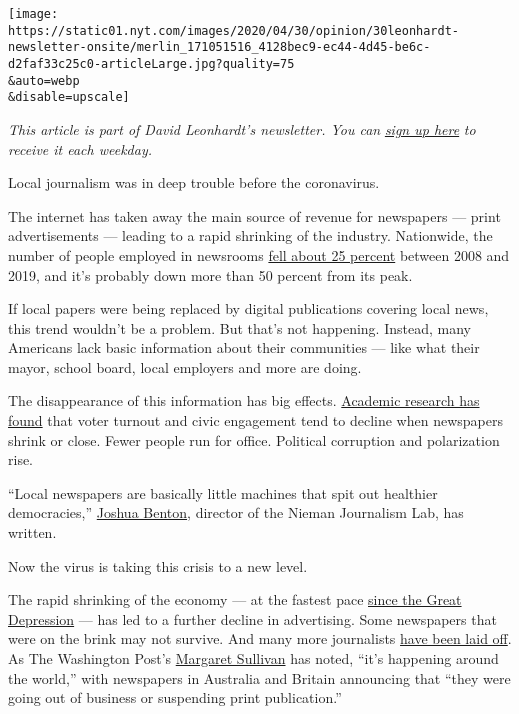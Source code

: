 \texttt{[image: https://static01.nyt.com/images/2020/04/30/opinion/30leonhardt-newsletter-onsite/merlin\_171051516\_4128bec9-ec44-4d45-be6c-d2faf33c25c0-articleLarge.jpg?quality=75\\\&auto=webp\\\&disable=upscale]}

\emph{This article is part of David Leonhardt's newsletter. You can}
\href{https://www.nytimes.com/newsletters/opiniontoday?action=click\&module=Intentional\&pgtype=Article}{\emph{sign
up here}} \emph{to receive it each weekday.}

Local journalism was in deep trouble before the coronavirus.

The internet has taken away the main source of revenue for newspapers
--- print advertisements --- leading to a rapid shrinking of the
industry. Nationwide, the number of people employed in newsrooms
\href{https://www.pewresearch.org/fact-tank/2020/04/20/u-s-newsroom-employment-has-dropped-by-a-quarter-since-2008/}{fell
about 25 percent} between 2008 and 2019, and it's probably down more
than 50 percent from its peak.

If local papers were being replaced by digital publications covering
local news, this trend wouldn't be a problem. But that's not happening.
Instead, many Americans lack basic information about their communities
--- like what their mayor, school board, local employers and more are
doing.

The disappearance of this information has big effects.
\href{https://medium.com/office-of-citizen/how-we-know-journalism-is-good-for-democracy-9125e5c995fb}{Academic
research has found} that voter turnout and civic engagement tend to
decline when newspapers shrink or close. Fewer people run for office.
Political corruption and polarization rise.

``Local newspapers are basically little machines that spit out healthier
democracies,''
\href{https://www.niemanlab.org/2019/04/when-local-newspapers-shrink-fewer-people-bother-to-run-for-mayor/}{Joshua
Benton}, director of the Nieman Journalism Lab, has written.

Now the virus is taking this crisis to a new level.

The rapid shrinking of the economy --- at the fastest pace
\href{https://www.nytimes.com/2020/04/14/us/politics/coronavirus-economy-recession-depression.html}{since
the Great Depression} --- has led to a further decline in advertising.
Some newspapers that were on the brink may not survive. And many more
journalists
\href{https://www.nytimes.com/2020/04/10/business/media/news-media-coronavirus-jobs.html}{have
been laid off}. As The Washington Post's
\href{https://www.washingtonpost.com/lifestyle/media/local-journalism-needs-a-coronavirus-stimulus-plan-too/2020/03/25/08358062-6ec6-11ea-b148-e4ce3fbd85b5_story.html}{Margaret
Sullivan} has noted, ``it's happening around the world,'' with
newspapers in Australia and Britain announcing that ``they were going
out of business or suspending print publication.''

